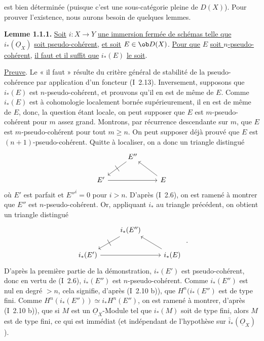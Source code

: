 est
bien déterminée (puisque c'est une sous-catégorie pleine de \(D(X)\)). Pour prouver l'existence, nous aurons besoin de quelques lemmes.

\textbf{Lemme 1.1.1.} \uline{Soit} \(i:X\to Y\) \uline{une immersion fermée de schémas telle que} \(i_*(\underline{O}_X)\) \uline{soit pseudo-cohérent}, \uline{et soit} \(E\in\ob D(X)\). \uline{Pour que} \(E\) \uline{soit \(n\)-pseudo-cohérent}, \uline{il faut et il suffit que} \(i_*(E)\) \uline{le soit}.

\uline{Preuve}. Le « il faut » résulte du critère général de stabilité de la pseudo-cohérence par application d'un foncteur (I~2.13). Inversement, supposons que \(i_*(E)\) est \(n\)-pseudo-cohérent, et prouvons qu'il en est de même de \(E\). Comme \(i_*(E)\) est à cohomologie localement bornée supérieurement, il en est de même de \(E\), donc, la question étant locale, on peut supposer que \(E\) est \(m\)-pseudo-cohérent pour \(m\) assez grand. Montrons, par récurrence descendante sur \(m\), que \(E\) est \(m\)-pseudo-cohérent pour tout \(m\geq n\). On peut supposer déjà prouvé que \(E\) est \((n+1)\)-pseudo-cohérent. Quitte à localiser, on a donc un triangle distingué
\[
\begin{tikzcd}
& E'' \arrow[dl,"|" marking] & \\
E' \arrow[rr] & & E \arrow[ul]
\end{tikzcd}
\]
où \(E'\) est parfait et \(E''^i=0\) pour \(i>n\). D'après (I~2.6), on est ramené à montrer que \(E''\) est \(n\)-pseudo-cohérent. Or, appliquant \(i_*\) au triangle précédent, on obtient un triangle distingué
\[
\begin{tikzcd}
& i_*(E'') \arrow[dl,"|" marking] & \\
i_*(E') \arrow[rr] & & i_*(E) \arrow[ul]
\end{tikzcd}\ .
\]
D'après la première partie de la démonstration, \(i_*(E')\) est pseudo-cohérent, donc en vertu de (I~2.6), \(i_*(E'')\) est \(n\)-pseudo-cohérent. Comme \(i_*(E'')\) est nul en degré \(>n\), cela signifie, d'après (I~2.10 b)), que \(H^n(i_*(E'')\) est de type fini. Comme \(H^n(i_*(E''))\simeq i_*H^n(E'')\), on est ramené à montrer, d'après (I~2.10 b)), que si \(M\) est un \(\underline{O}_X\)-Module tel que \(i_*(M)\) soit de type fini, alors \(M\) est de type fini, ce qui est immédiat (et indépendant de l'hypothèse sur \(\bar i_*(\underline{O}_X)\)).

